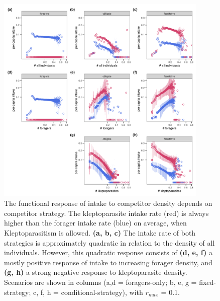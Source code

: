 \documentclass[11pt]{article}
\begin{document}
\begin{figure}[h!]
    \centering
    \includegraphics[width=0.90\textwidth]{figures/fig_04_functional_response.png}
    \caption{The functional response of intake to competitor density depends on competitor strategy.
    The kleptoparasite intake rate (red) is always higher than the forager intake rate (blue) on average, when Kleptoparasitism is allowed.
    \textbf{(a, b, c)} The intake rate of both strategies is approximately quadratic in relation to the density of all individuals.
    However, this quadratic response consists of \textbf{(d, e, f)} a mostly positive response of intake to increasing forager density, and \textbf{(g, h)} a strong negative response to kleptoparasite density.
    Scenarios are shown in columns (a,d = foragers-only; b, e, g = fixed-strategy; c, f, h = conditional-strategy), with $r_{max}$ = 0.1.
    }
    \label{Fig:FunctionalResponse}
\end{figure}
\end{document}
